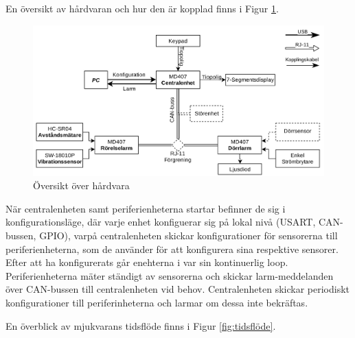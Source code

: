 \documentclass{article}
\begin{document}
En översikt av hårdvaran och hur den är kopplad finns i Figur \ref{fig:hårdvara}.
\begin{figure}[H] %
    \centering
    \includegraphics[width=1\textwidth]{figurer/HardvaraOversikt.jpg}
    \caption{Översikt över hårdvara}
    \label{fig:hårdvara}
\end{figure}

När centralenheten samt periferienheterna startar befinner de sig i konfigurationsläge,
 där varje enhet konfiguerar sig på lokal nivå
 (USART, CAN-bussen, GPIO), varpå centralenheten skickar konfigurationer
  för sensorerna till periferienheterna, som de använder för att konfigurera sina respektive sensorer. Efter att ha konfigurerats går enehterna i var sin kontinuerlig loop. Periferienheterna mäter ständigt av sensorerna och skickar larm-meddelanden över CAN-bussen till centralenheten vid behov. Centralenheten skickar periodiskt konfigurationer till periferinheterna och larmar om dessa inte bekräftas.

En överblick av mjukvarans tidsflöde finns i Figur \ref{fig:tidsflöde}.
\end{document}
